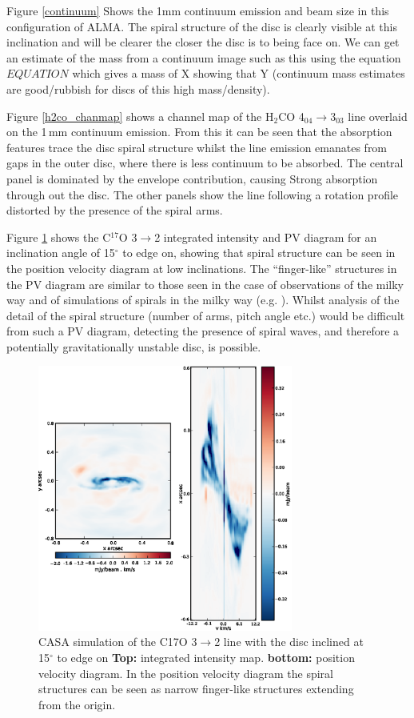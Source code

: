 \documentclass[useAMS,usenatbib]{mn2e}
\begin{document}
Figure \ref{continuum} Shows the 1mm continuum emission and beam size in this configuration of ALMA. The spiral structure of the disc is clearly visible at this inclination and will be clearer the closer the disc is to being face on. We can get an estimate of the mass from a continuum image such as this using the equation $EQUATION$ \cite{equn_ref} which gives a mass of X showing that Y (continuum mass estimates are good/rubbish for discs of this high mass/density).\smallskip 

Figure \ref{h2co_chanmap} shows a channel map of the H$_2$CO 4$_{04}\rightarrow$3$_{03}$ line overlaid on the 1$\,$mm continuum emission. From this it can be seen that the absorption features trace the disc spiral structure whilst the line emission emanates from gaps in the outer disc, where there is less continuum to be absorbed. The central panel is dominated by the envelope contribution, causing Strong absorption through out the disc. The other panels show the line following a rotation profile distorted by the presence of the spiral arms. \smallskip

Figure \ref{15deg} shows the C$^{17}$O 3$\rightarrow$2 integrated intensity and PV diagram for an inclination angle of 15$^\circ$ to edge on, showing that spiral structure can be seen in the position velocity diagram at low inclinations. The ``finger-like'' structures in the PV diagram are similar to those seen in the case of observations of the milky way and of simulations of spirals in the milky way (e.g. \citealt{Bissantz2003}). Whilst analysis of the detail of the spiral structure (number of arms, pitch angle etc.) would be difficult from such a PV diagram, detecting the presence of spiral waves, and therefore a potentially gravitationally unstable disc, is possible.\smallskip

\begin{figure}
 \includegraphics[width=84mm]{Figures/sim/casa_C17O_15deg_all2.eps}

 \caption{CASA simulation of the C17O 3$\rightarrow$2 line with the disc inclined at 15$^\circ$ to edge on {\bf Top:} integrated intensity map. {\bf bottom:} position velocity diagram. In the position velocity diagram the spiral structures can be seen as narrow finger-like structures extending from the origin.}
 \label{15deg}
\end{figure}
\end{document}
